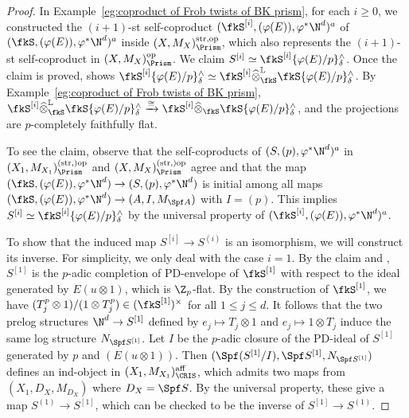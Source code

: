 \begin{proof}
In Example~\ref{eg:coproduct of Frob twists of BK prism}, for each $i \geq 0$, we constructed the $(i+1)$-st self-coproduct $(\fkS^{[i]},(\varphi(E)),\varphi^\ast\N^d)^a$ of $(\fkS,(\varphi(E)),\varphi^\ast\N^d)^a$ inside $(X,M_{X})_\Prism^{\mathrm{str},\mathrm{op}}$, which also represents the $(i+1)$-st self-coproduct in $(X,M_{X})_\Prism^{\mathrm{op}}$. We claim $S^{[i]} \simeq \fkS^{[i]}\{\varphi(E)/p\}^\wedge_\delta$. Once the claim is proved, \cite[Prop. 3.13(3)]{bhatt-scholze-prismaticcohom} shows $\fkS^{[i]}\{\varphi(E)/p\}^\wedge_\delta \simeq \fkS^{[i]}\widehat{\otimes}^\mathbb{L}_{\fkS}\fkS\{\varphi(E)/p\}^\wedge_\delta$. By Example~\ref{eg:coproduct of Frob twists of BK prism},  $\fkS^{[i]}\widehat{\otimes}^\mathbb{L}_{\fkS}\fkS\{\varphi(E)/p\}^\wedge_\delta \xrightarrow{\cong} \fkS^{[i]}\widehat{\otimes}_{\fkS}\fkS\{\varphi(E)/p\}^\wedge_\delta$, and the projections are $p$-completely faithfully flat. 

To see the claim, observe that the self-coproducts of $(S,(p), \varphi^\ast \N^d)^a$ in $(X_1,M_{X_1})_\Prism^{(\mathrm{str},)\mathrm{op}}$ and $(X,M_X)_\Prism^{(\mathrm{str},)\mathrm{op}}$ agree and that the map $(\fkS,(\varphi(E)),\varphi^\ast\N^d) \to (S,(p),\varphi^\ast\N^d)$ is initial among all maps $(\fkS,(\varphi(E)),\varphi^\ast\N^d) \to (A,I,M_{\Spf A})$ with $I=(p)$. This implies $S^{[i]} \simeq \fkS^{[i]}\{\varphi(E)/p\}^\wedge_\delta$ by the universal property of $(\fkS^{[i]},(\varphi(E)),\varphi^\ast\N^d)^a$.

To show that the induced map $S^{[i]} \to S^{(i)}$ is an isomorphism, we will construct its inverse. For simplicity, we only deal with the case $i=1$. By the claim and \cite[Cor.~2.39]{bhatt-scholze-prismaticcohom}, $S^{[1]}$ is the $p$-adic completion of PD-envelope of $\fkS^{[1]}$ with respect to the ideal generated by $E(u\otimes 1)$, which is $\Z_p$-flat. By the construction of $\fkS^{[1]}$, we have $(T_j^p\otimes 1)/(1\otimes T_j^p) \in (\fkS^{[1]})^\times$ for all $1\leq j \leq d$. It follows that the two prelog structures $\N^d \to S^{[1]}$ defined by $e_j \mapsto T_j\otimes 1$ and $e_j \mapsto 1\otimes T_j$ induce the same log structure $N_{\Spf S^{[1]}}$. Let $I$ be the $p$-adic closure of the PD-ideal of $S^{[1]}$ generated by $p$ and $(E(u\otimes1))$. Then $(\Spf(S^{[1]}/I), \Spf S^{[1]},N_{\Spf S^{[1]}})$ defines an ind-object in $(X_1,M_{X_1})_{\CRIS}^{\mathrm{aff}}$, which admits two maps from $(X_1, D_X, M_{D_X})$ where $D_X=\Spf S$. By the universal property, these give a map $S^{(1)} \to S^{[1]}$, which can be checked to be the inverse of $S^{[1]} \to S^{(1)}$.
\end{proof}

